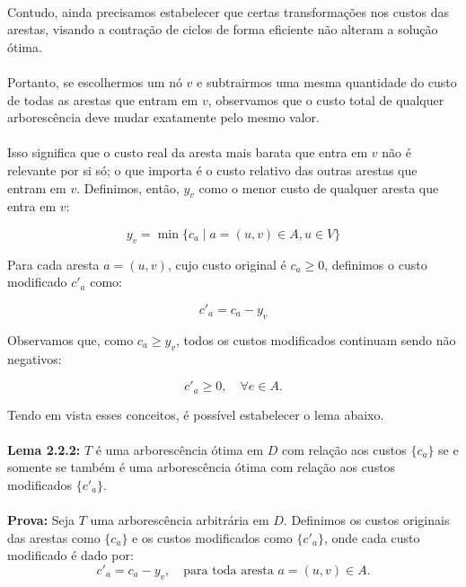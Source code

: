 \documentclass[12pt,a4paper]{article}
\begin{document}
\paragraph{}
Contudo, ainda precisamos estabelecer que certas transformações nos custos das arestas, visando a contração de ciclos de forma eficiente não alteram a solução ótima. 

\paragraph{}
Portanto, se escolhermos um nó \( v \) e subtrairmos uma mesma quantidade do custo de todas as arestas que entram em \( v \), observamos que o custo total de qualquer arborescência deve mudar exatamente pelo mesmo valor.

\paragraph{}
Isso significa que o custo real da aresta mais barata que entra em \( v \) não é relevante por si só; o que importa é o custo relativo das outras arestas que entram em \( v \). Definimos, então, \( y_v \) como o menor custo de qualquer aresta que entra em \( v \):

\[
y_v = \min \{ c_a \mid a = (u, v) \in A, u \in V \}
\]

Para cada aresta \( a = (u, v) \), cujo custo original é \( c_a \geq 0 \), definimos o custo modificado \( c'_a \) como:

\[
c'_a = c_a - y_v
\]

Observamos que, como \( c_a \geq y_v \), todos os custos modificados continuam sendo não negativos:

\[
c'_a \geq 0, \quad \forall e \in A.
\]

Tendo em vista esses conceitos, é possível estabelecer o lema abaixo.

\paragraph{}
\textbf{Lema 2.2.2:} \(T\) é uma arborescência ótima em \(D\) com relação aos custos \(\{c_a\}\) se e somente se também é uma arborescência ótima com relação aos custos modificados \(\{c'_a\}\).

\paragraph{}
\textbf{Prova:} 
Seja \( T \) uma arborescência arbitrária em \( D \). Definimos os custos originais das arestas como \( \{c_a\} \) e os custos modificados como \( \{c'_a\} \), onde cada custo modificado é dado por:
\[
c'_a = c_a - y_v, \quad \text{para toda aresta } a = (u, v) \in A.
\]
\end{document}
